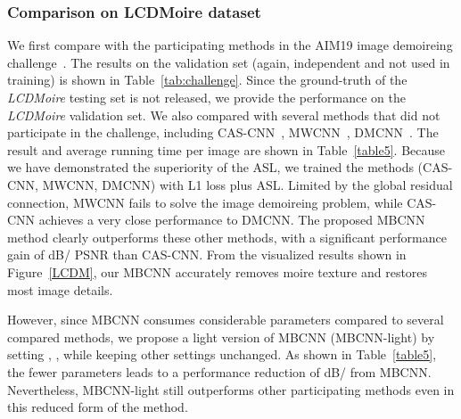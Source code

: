 \documentclass[10pt,twocolumn,letterpaper]{article}
\begin{document}
\begin{table}[h]
\normalsize 
  \centering
    	\caption{Performance comparison of MBCNN models and other related works on \emph{TIP2018} dataset.}
	\label{table6}
\end{table}




\subsubsection{Comparison on LCDMoire dataset}
\label{sec4_4_1}
We first compare with the participating methods in the AIM19 image demoireing challenge~\cite{AIM19demoireMethods}. The results on the validation set (again, independent and not used in training) is shown in Table~\ref{tab:challenge}.
Since the ground-truth of the \emph{LCDMoire} testing set is not released, we provide the performance on the \emph{LCDMoire} validation set.   
We also compared with several methods that did not participate in the challenge, including CAS-CNN~\cite{CAS-CNN}, MWCNN~\cite{MWCNN}, DMCNN~\cite{sun2018moire}. The result and average running time per image are shown in Table~\ref{table5}.  
Because we have demonstrated the superiority of the ASL, we trained the methods (CAS-CNN, MWCNN, DMCNN) with L1 loss plus ASL. 
Limited by the global residual connection, MWCNN fails to solve the image demoireing problem, while CAS-CNN achieves a very close performance to DMCNN. 
The proposed MBCNN method clearly outperforms these other methods, with a significant performance gain of dB/ PSNR than CAS-CNN. 
From the visualized results shown in Figure~\ref{LCDM}, our MBCNN accurately removes moire texture and restores most image details. 

However, since MBCNN consumes considerable parameters compared to several compared methods, we propose a light version of MBCNN (MBCNN-light) by setting , , while keeping other settings unchanged. 
As shown in Table~\ref{table5}, the fewer parameters leads to a performance reduction of  dB/ from MBCNN. 
Nevertheless, MBCNN-light still outperforms other participating methods even in this reduced form of the method. 
\end{document}
